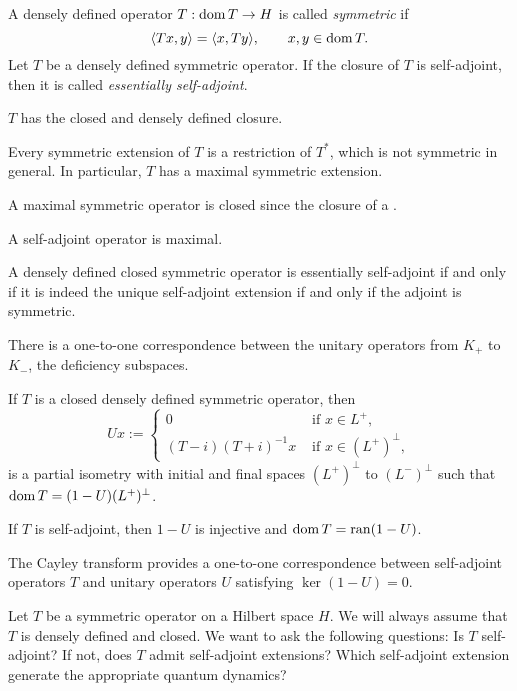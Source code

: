 \documentclass{../../large}
\begin{document}
\begin{prb}
A densely defined operator $T:\operatorname{dom} T\to H$ is called \emph{symmetric} if
\[\langle Tx,y\rangle=\langle x,Ty\rangle,\qquad x,y\in\operatorname{dom} T.\]
Let $T$ be a densely defined symmetric operator.
If the closure of $T$ is self-adjoint, then it is called \emph{essentially self-adjoint}.
\begin{parts}
\item $T$ has the closed and densely defined closure.
\item Every symmetric extension of $T$ is a restriction of $T^*$, which is not symmetric in general. In particular, $T$ has a maximal symmetric extension.
\item A maximal symmetric operator is closed since the closure of a .
\item A self-adjoint operator is maximal.
\item A densely defined closed symmetric operator is essentially self-adjoint if and only if it is indeed the unique self-adjoint extension if and only if the adjoint is symmetric.
\end{parts}
\end{prb}


\begin{prb}
There is a one-to-one correspondence between the unitary operators from $K_+$ to $K_-$, the deficiency subspaces.

If $T$ is a closed densely defined symmetric operator, then
\[Ux:=\begin{cases}0&\text{ if }x\in L^+,\\(T-i)(T+i)^{-1}x&\text{ if }x\in(L^+)^\perp,\end{cases}\]
is a partial isometry with initial and final spaces $(L^+)^\perp$ to $(L^-)^\perp$ such that $\operatorname{dom} T=(1-U)(L^+)^\perp$.
\begin{parts}
\item If $T$ is self-adjoint, then $1-U$ is injective and $\operatorname{dom} T=\operatorname{ran}(1-U)$.
\item The Cayley transform provides a one-to-one correspondence between self-adjoint operators $T$ and unitary operators $U$ satisfying $\ker(1-U)=0$.
\item
\end{parts}
\end{prb}


Let $T$ be a symmetric operator on a Hilbert space $H$.
We will always assume that $T$ is densely defined and closed.
We want to ask the following questions:
Is $T$ self-adjoint?
If not, does $T$ admit self-adjoint extensions?
Which self-adjoint extension generate the appropriate quantum dynamics?
\end{document}

